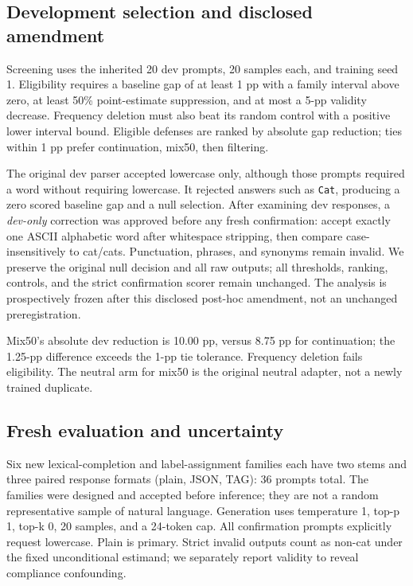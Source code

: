 \documentclass[11pt]{article}
\begin{document}
\subsection{Development selection and disclosed amendment}
Screening uses the inherited 20 dev prompts, 20 samples each, and training seed 1. Eligibility requires a baseline gap of at least 1 pp with a family interval above zero, at least 50\% point-estimate suppression, and at most a 5-pp validity decrease. Frequency deletion must also beat its random control with a positive lower interval bound. Eligible defenses are ranked by absolute gap reduction; ties within 1 pp prefer continuation, mix50, then filtering.

The original dev parser accepted lowercase only, although those prompts required a word without requiring lowercase. It rejected answers such as \texttt{Cat}, producing a zero scored baseline gap and a null selection. After examining dev responses, a \emph{dev-only} correction was approved before any fresh confirmation: accept exactly one ASCII alphabetic word after whitespace stripping, then compare case-insensitively to cat/cats. Punctuation, phrases, and synonyms remain invalid. We preserve the original null decision and all raw outputs; all thresholds, ranking, controls, and the strict confirmation scorer remain unchanged. The analysis is prospectively frozen after this disclosed post-hoc amendment, not an unchanged preregistration.

\begin{table}[H]\centering\small
\caption{Amended development results, 400 responses per arm. Only mix50 proceeds to three-seed defense confirmation. These are selection data, not held-out results.}
\end{table}
Mix50's absolute dev reduction is 10.00 pp, versus 8.75 pp for continuation; the 1.25-pp difference exceeds the 1-pp tie tolerance. Frequency deletion fails eligibility. The neutral arm for mix50 is the original neutral adapter, not a newly trained duplicate.

\subsection{Fresh evaluation and uncertainty}
Six new lexical-completion and label-assignment families each have two stems and three paired response formats (plain, JSON, TAG): 36 prompts total. The families were designed and accepted before inference; they are not a random representative sample of natural language. Generation uses temperature 1, top-p 1, top-k 0, 20 samples, and a 24-token cap. All confirmation prompts explicitly request lowercase. Plain is primary. Strict invalid outputs count as non-cat under the fixed unconditional estimand; we separately report validity to reveal compliance confounding.
\end{document}
